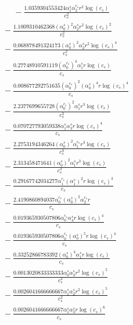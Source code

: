 \documentclass[10pt]{article}
\begin{document}
\begin{align*}
\phantom{R_{0,7}} &\phantom{={}}{}  - \frac{1.0359304553424 \alpha_{1}^s \alpha_{2}^{c_s} r^{2} \log{\left(c_{s} \right)}}{c_{s}^{2}} \\
&{}  - \frac{1.1009310462368 \left(\alpha_{0}^s\right)^{2} \alpha_{2}^s r^{2} \log{\left(c_{s} \right)}^{2}}{c_{s}^{2}} \\
&{}  - \frac{0.068878491324173 \left(\alpha_{0}^s\right)^{2} \alpha_{2}^s r^{2} \log{\left(c_{s} \right)}^{4}}{c_{s}^{2}} \\
&{}  - \frac{0.27748910591119 \left(\alpha_{0}^{c_s}\right)^{4} \alpha_{1}^s r \log{\left(c_{s} \right)}}{c_{s}} \\
&{}  - \frac{0.008677292751635 \left(\alpha_{0}^{c_s}\right)^{2} \left(\alpha_{0}^s\right)^{4} r \log{\left(c_{s} \right)}^{4}}{c_{s}} \\
&{}  - \frac{2.2377699655728 \left(\alpha_{0}^{c_s}\right)^{2} \alpha_{1}^s r^{3} \log{\left(c_{s} \right)}}{c_{s}^{3}} \\
&{}  - \frac{0.070727793059338 \alpha_{1}^s \alpha_{3}^s r \log{\left(c_{s} \right)}^{4}}{c_{s}} \\
&{}  - \frac{2.2753194346264 \left(\alpha_{0}^s\right)^{2} \alpha_{1}^{c_s} r^{3} \log{\left(c_{s} \right)}}{c_{s}^{3}} \\
&{}  - \frac{2.313458471641 \left(\alpha_{0}^s\right)^{2} \alpha_{1}^s r^{3} \log{\left(c_{s} \right)}}{c_{s}^{3}} \\
&{}  - \frac{0.29167742034277 \alpha_{1}^{c_s} \left(\alpha_{1}^s\right)^{2} r \log{\left(c_{s} \right)}^{3}}{c_{s}} \\
&{}  - \frac{2.4190860894037 \alpha_{0}^{c_s} \left(\alpha_{0}^s\right)^{2} \alpha_{2}^{c_s} r}{c_{s}} \\
&{}  - \frac{0.019365930507806 \alpha_{0}^{c_s} \alpha_{4}^s r \log{\left(c_{s} \right)}^{4}}{c_{s}} \\
&{}  - \frac{0.019365930507806 \alpha_{0}^{c_s} \left(\alpha_{0}^s\right)^{5} r \log{\left(c_{s} \right)}^{4}}{c_{s}} \\
&{}  - \frac{0.33252866783392 \left(\alpha_{0}^s\right)^{4} \alpha_{1}^s r \log{\left(c_{s} \right)}}{c_{s}} \\
&{}  - \frac{0.0013020833333333 \alpha_{0}^s \alpha_{3}^s r^{2} \log{\left(c_{s} \right)}^{5}}{c_{s}^{2}} \\
&{}  - \frac{0.0026041666666667 \alpha_{1}^s \alpha_{2}^s r^{2} \log{\left(c_{s} \right)}^{5}}{c_{s}^{2}} \\
&{}  - \frac{0.0026041666666667 \alpha_{1}^s \alpha_{3}^s r \log{\left(c_{s} \right)}^{6}}{c_{s}} \\

\end{align*}
\end{document}
